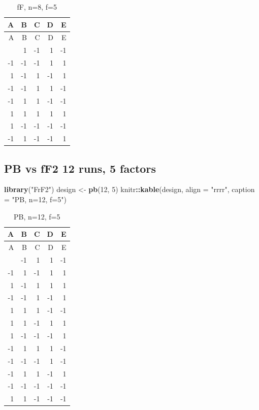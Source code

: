 \documentclass[
  12pt,
  a4paper,
]{article}
\newenvironment{Shaded}{\begin{snugshade}}{\end{snugshade}}
\newcommand{\AttributeTok}[1]{\textcolor[rgb]{0.13,0.29,0.53}{#1}}
\newcommand{\DecValTok}[1]{\textcolor[rgb]{0.00,0.00,0.81}{#1}}
\newcommand{\FunctionTok}[1]{\textcolor[rgb]{0.13,0.29,0.53}{\textbf{#1}}}
\newcommand{\NormalTok}[1]{#1}
\newcommand{\OtherTok}[1]{\textcolor[rgb]{0.56,0.35,0.01}{#1}}
\newcommand{\SpecialCharTok}[1]{\textcolor[rgb]{0.81,0.36,0.00}{\textbf{#1}}}
\newcommand{\StringTok}[1]{\textcolor[rgb]{0.31,0.60,0.02}{#1}}
\numberwithin{equation}{section}
\theoremstyle{plain}
\theoremstyle{definition}
\theoremstyle{remark}
\theoremstyle{note}
\begin{document}
\begin{longtable}[]{@{}rrrrr@{}}
\caption{fF, n=8, f=5}\tabularnewline
\toprule\noalign{}
A & B & C & D & E \\
\midrule\noalign{}
\endfirsthead
\toprule\noalign{}
A & B & C & D & E \\
\midrule\noalign{}
\endhead
\bottomrule\noalign{}
\endlastfoot
1 & 1 & -1 & 1 & -1 \\
-1 & -1 & -1 & 1 & 1 \\
1 & -1 & 1 & -1 & 1 \\
-1 & -1 & 1 & 1 & -1 \\
-1 & 1 & 1 & -1 & -1 \\
1 & 1 & 1 & 1 & 1 \\
1 & -1 & -1 & -1 & -1 \\
-1 & 1 & -1 & -1 & 1 \\
\end{longtable}

\newpage

\hypertarget{pb-vs-ff2-12-runs-5-factors}{%
\subsection{PB vs fF2 12 runs, 5
factors}\label{pb-vs-ff2-12-runs-5-factors}}

\begin{Shaded}
\begin{Highlighting}[]
\FunctionTok{library}\NormalTok{(}\StringTok{"FrF2"}\NormalTok{)}
\NormalTok{design }\OtherTok{\textless{}{-}} \FunctionTok{pb}\NormalTok{(}\DecValTok{12}\NormalTok{, }\DecValTok{5}\NormalTok{)}
\NormalTok{knitr}\SpecialCharTok{::}\FunctionTok{kable}\NormalTok{(design, }\AttributeTok{align =} \StringTok{"rrrr"}\NormalTok{, }\AttributeTok{caption =} \StringTok{"PB, n=12, f=5"}\NormalTok{)}
\end{Highlighting}
\end{Shaded}

\begin{longtable}[]{@{}rrrrr@{}}
\caption{PB, n=12, f=5}\tabularnewline
\toprule\noalign{}
A & B & C & D & E \\
\midrule\noalign{}
\endfirsthead
\toprule\noalign{}
A & B & C & D & E \\
\midrule\noalign{}
\endhead
\bottomrule\noalign{}
\endlastfoot
1 & -1 & 1 & 1 & -1 \\
-1 & 1 & -1 & 1 & 1 \\
1 & -1 & 1 & 1 & 1 \\
-1 & -1 & 1 & -1 & 1 \\
1 & 1 & 1 & -1 & -1 \\
1 & 1 & -1 & 1 & 1 \\
1 & -1 & -1 & -1 & 1 \\
-1 & 1 & 1 & 1 & -1 \\
-1 & -1 & -1 & 1 & -1 \\
-1 & 1 & 1 & -1 & 1 \\
-1 & -1 & -1 & -1 & -1 \\
1 & 1 & -1 & -1 & -1 \\
\end{longtable}
\end{document}
